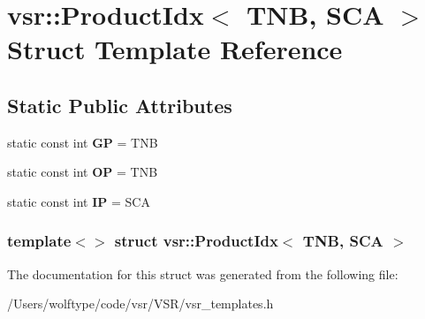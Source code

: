 \hypertarget{structvsr_1_1_product_idx_3_01_t_n_b_00_01_s_c_a_01_4}{\section{vsr\-:\-:Product\-Idx$<$ T\-N\-B, S\-C\-A $>$ Struct Template Reference}
\label{structvsr_1_1_product_idx_3_01_t_n_b_00_01_s_c_a_01_4}
}
\subsection*{Static Public Attributes}
\begin{DoxyCompactItemize}
\item 
\hypertarget{structvsr_1_1_product_idx_3_01_t_n_b_00_01_s_c_a_01_4_accbc2a363f7f16cac76537bca8d8a161}{static const int {\bfseries G\-P} = T\-N\-B}\label{structvsr_1_1_product_idx_3_01_t_n_b_00_01_s_c_a_01_4_accbc2a363f7f16cac76537bca8d8a161}

\item 
\hypertarget{structvsr_1_1_product_idx_3_01_t_n_b_00_01_s_c_a_01_4_ad2680d175822f0dd91429054f81e3162}{static const int {\bfseries O\-P} = T\-N\-B}\label{structvsr_1_1_product_idx_3_01_t_n_b_00_01_s_c_a_01_4_ad2680d175822f0dd91429054f81e3162}

\item 
\hypertarget{structvsr_1_1_product_idx_3_01_t_n_b_00_01_s_c_a_01_4_a99719ca2b3faa87316ca275ef63f0e12}{static const int {\bfseries I\-P} = S\-C\-A}\label{structvsr_1_1_product_idx_3_01_t_n_b_00_01_s_c_a_01_4_a99719ca2b3faa87316ca275ef63f0e12}

\end{DoxyCompactItemize}
\subsubsection*{template$<$$>$ struct vsr\-::\-Product\-Idx$<$ T\-N\-B, S\-C\-A $>$}



The documentation for this struct was generated from the following file\-:\begin{DoxyCompactItemize}
\item 
/\-Users/wolftype/code/vsr/\-V\-S\-R/vsr\-\_\-templates.\-h\end{DoxyCompactItemize}
